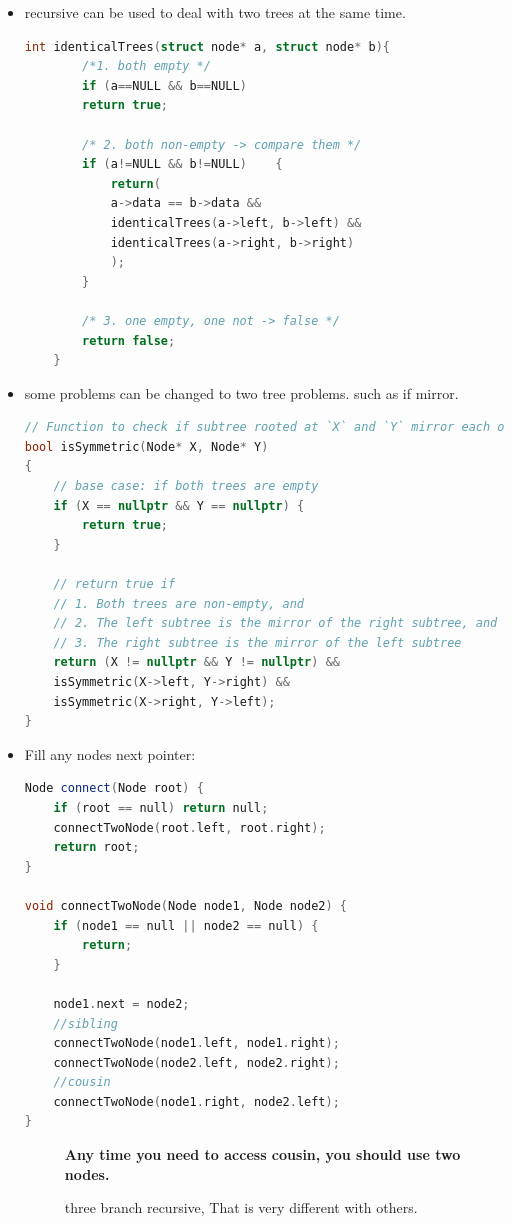\documentclass[a4paper,11pt,twoside]{book}
\begin{document}
\begin{itemize}
	\item recursive can be used to deal with two trees at the same time. 
\begin{lstlisting}[frame=single, language=c++]
	int identicalTrees(struct node* a, struct node* b){
		/*1. both empty */
		if (a==NULL && b==NULL)
		return true;
		
		/* 2. both non-empty -> compare them */
		if (a!=NULL && b!=NULL)    {
			return(
			a->data == b->data &&
			identicalTrees(a->left, b->left) &&
			identicalTrees(a->right, b->right)
			);
		} 
		
		/* 3. one empty, one not -> false */
		return false;
	} 
\end{lstlisting}	

\item some problems can be changed to two tree problems. such as if mirror. 

\begin{lstlisting}[frame=single, language=c++]
// Function to check if subtree rooted at `X` and `Y` mirror each other
bool isSymmetric(Node* X, Node* Y)
{
	// base case: if both trees are empty
	if (X == nullptr && Y == nullptr) {
		return true;
	}
	
	// return true if
	// 1. Both trees are non-empty, and
	// 2. The left subtree is the mirror of the right subtree, and
	// 3. The right subtree is the mirror of the left subtree
	return (X != nullptr && Y != nullptr) &&
	isSymmetric(X->left, Y->right) &&
	isSymmetric(X->right, Y->left);
}
\end{lstlisting}


\item Fill any nodes next pointer:
\begin{lstlisting}[frame=single, language=c++]
Node connect(Node root) {
	if (root == null) return null;
	connectTwoNode(root.left, root.right);
	return root;
}

void connectTwoNode(Node node1, Node node2) {
	if (node1 == null || node2 == null) {
		return;
	}

	node1.next = node2;
	//sibling	
	connectTwoNode(node1.left, node1.right);
	connectTwoNode(node2.left, node2.right);
	//cousin
	connectTwoNode(node1.right, node2.left);
}
\end{lstlisting}
\begin{description}
	\item[] \textbf{Any time you need to access cousin, you should use two nodes.}
	\item[] three branch recursive, That is very different with others. 
\end{description}


\end{itemize}
\end{document}
